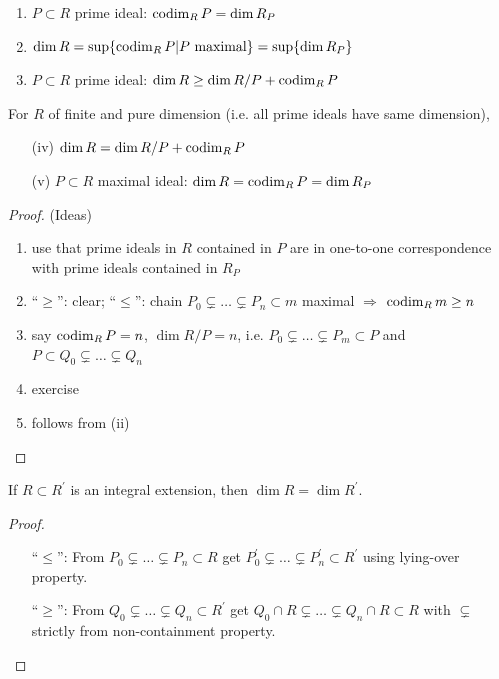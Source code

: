 \documentclass[a4paper,11pt]{article}
\begin{document}
			\begin{prop}
				\begin{enumerate}
					\item $P\subset R$ prime ideal: $\operatorname{codim}_RP=\dim R_P$
					\item $\dim R=\sup\{\operatorname{codim}_RP|P\text{ maximal}\}=\sup\{\dim R_P\}$
					\item $P\subset R$ prime ideal: $\dim R\ge\dim R/P+\operatorname{codim}_RP$
				\end{enumerate}
				\vspace{1em}
				\noindent For $R$ of finite and pure dimension (i.e. all prime ideals have same dimension),
				\begin{enumerate}
					\item[(iv)] $\dim R=\dim R/P+\operatorname{codim}_RP$
					\item[(v)] $P\subset R$ maximal ideal: $\dim R=\operatorname{codim}_RP=\dim R_P$
				\end{enumerate}
			\end{prop}
			\begin{proof}\renewcommand{\qedsymbol}{}
				(Ideas)\begin{enumerate}
					\item use that prime ideals in $R$ contained in $P$ are in one-to-one correspondence with prime ideals contained in $R_P$
					\item ``$\ge$'': clear; ``$\le$'': chain $P_0\subsetneq\dots\subsetneq P_n\subset m$ maximal $\Longrightarrow$ $\operatorname{codim}_Rm\ge n$
					\item say $\operatorname{codim}_RP=n$, $\dim R/P=n$, i.e. $P_0\subsetneq\dots\subsetneq P_m\subset P$ and $P\subset Q_0\subsetneq\dots\subsetneq Q_n$
					\item exercise
					\item follows from (ii)
				\end{enumerate}
			\end{proof}\renewcommand{\qedsymbol}{$\square$}

			\begin{prop}
				If $R\subset R^\prime$ is an integral extension, then $\dim R=\dim R^\prime$.		
			\end{prop}
			\begin{proof}
				\begin{enumerate}
					\item[``$\le$'':] From $P_0\subsetneq\dots\subsetneq P_n\subset R$ get $P_0^\prime\subsetneq\dots\subsetneq P_n^\prime\subset R^\prime$ using lying-over property. 
					\item[``$\ge$'':] From $Q_0\subsetneq\dots\subsetneq Q_n\subset R^\prime$ get $Q_0\cap R\subsetneq\dots\subsetneq Q_n\cap R\subset R$ with $\subsetneq$ strictly from non-containment property.
				\end{enumerate}
			\end{proof}
\end{document}
